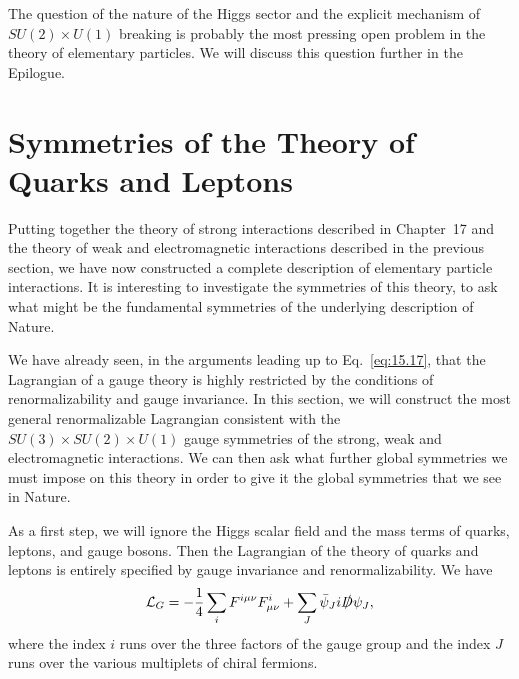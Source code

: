 The question of the nature of the Higgs sector and the explicit mechanism of
$SU(2)\times U(1)$ breaking is probably the most pressing open problem in the
theory of elementary particles.  We will discuss this question further in the
Epilogue.

\section{Symmetries of the Theory of Quarks and Leptons}

Putting together the theory of strong interactions described in Chapter~17 and
the theory of weak and electromagnetic interactions described in the previous
section, we have now constructed a complete description of elementary particle
interactions.  It is interesting to investigate the symmetries of this theory,
to ask what might be the fundamental symmetries of the underlying description
of Nature.

We have already seen, in the arguments leading up to Eq.~\eqref{eq:15.17},
that the Lagrangian of a gauge theory is highly restricted by the conditions
of renormalizability and gauge invariance.  In this section, we will construct
the most general renormalizable Lagrangian consistent with the
$SU(3)\times SU(2)\times U(1)$ gauge symmetries of the strong, weak and
electromagnetic interactions.  We can then ask what further global symmetries
we must impose on this theory in order to give it the global symmetries that
we see in Nature.

As a first step, we will ignore the Higgs scalar field and the mass terms of
quarks, leptons, and gauge bosons.  Then the Lagrangian of the theory of
quarks and leptons is entirely specified by gauge invariance and
renormalizability.  We have
\begin{equation}
  \mathcal{L}_{G} = -\frac{1}{4}\sum_i F^{i\mu\nu}F^i_{\mu\nu}
    + \sum_J \bar{\psi}_J i\slashed{D}\psi_J ,
  \label{eq:20.126}
\end{equation}
where the index $i$ runs over the three factors of the gauge group and the
index $J$ runs over the various multiplets of chiral fermions.

